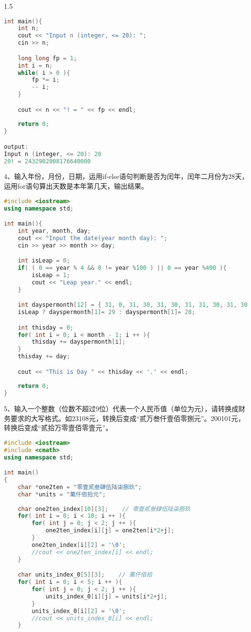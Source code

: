 \documentclass[14pt,aps,prb]{revtex4}
\begin{document}
\begin{spacing}{1.5}
\begin{lstlisting}[language=C++]
int main(){
    int n;
    cout << "Input n (integer, <= 20): ";
    cin >> n;

    long long fp = 1;
    int i = n;
    while( i > 0 ){
        fp *= i;
        -- i;
    }

    cout << n << "! = " << fp << endl;
    
    return 0;
}

output:
Input n (integer, <= 20): 20
20! = 2432902008176640000
\end{lstlisting}

4、输入年份，月份，日期，运用if-else语句判断是否为闰年，闰年二月份为28天，运用for语句算出天数是本年第几天，输出结果。
\begin{lstlisting}[language=C++]
#include <iostream>
using namespace std;

int main(){
    int year, month, day;
    cout << "Input the date(year month day): ";
    cin >> year >> month >> day;

    int isLeap = 0;
    if( ( 0 == year % 4 && 0 != year %100 ) || 0 == year %400 ){
        isLeap = 1;
        cout << "Leap year." << endl;
    }

    int dayspermonth[12] = { 31, 0, 31, 30, 31, 30, 31, 31, 30, 31, 30, 31 };
    isLeap ? dayspermonth[1]= 29 : dayspermonth[1]= 28;

    int thisday = 0;
    for( int i = 0; i < month - 1; i ++ ){
        thisday += dayspermonth[i];
    }
    thisday += day;

    cout << "This is Day " << thisday << '.' << endl;
    
    return 0;
}
\end{lstlisting}

5、输入一个整数（位数不超过9位）代表一个人民币值（单位为元），请转换成财务要求的大写格式。如23108元，转换后变成“贰万叁仟壹佰零捌元”。200101元，转换后变成“贰拾万零壹佰零壹元”。
\begin{lstlisting}[language=C++]
#include <iostream>
#include <cmath>
using namespace std;

int main()
{
	char *one2ten = "零壹贰叁肆伍陆柒捌玖";
    char *units = "萬仟佰拾元";
    
    char one2ten_index[10][3];    // 零壹贰叁肆伍陆柒捌玖
    for( int i = 0; i < 10; i ++ ){
        for( int j = 0; j < 2; j ++ ){
            one2ten_index[i][j] = one2ten[i*2+j];
        }
        one2ten_index[i][2] = '\0';
        //cout << one2ten_index[i] << endl;
    }

    char units_index_0[5][3];    // 萬仟佰拾
    for( int i = 0; i < 5; i ++ ){
        for( int j = 0; j < 2; j ++ ){
            units_index_0[i][j] = units[i*2+j];
        }
        units_index_0[i][2] = '\0';
        //cout << units_index_0[i] << endl;
    }


\end{lstlisting}
\end{spacing}
\end{document}

